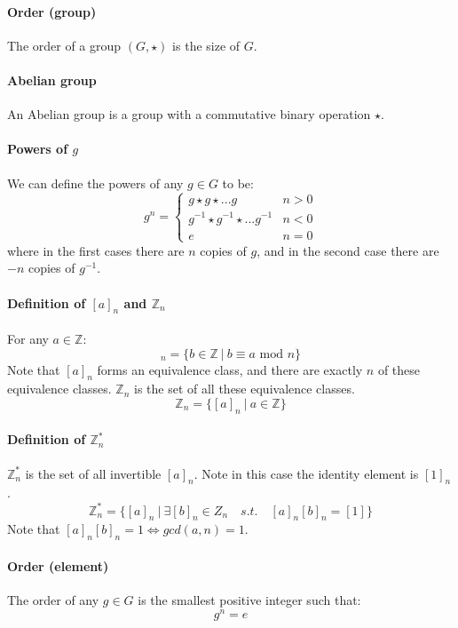\documentclass{article}
\newcommand{\Z}{\mathbb{Z}}
\begin{document}
\paragraph{Order (group)}
The order of a group $ (G, \star) $ is the size of $ G $.
\paragraph{Abelian group}
An Abelian group is a group with a commutative binary operation $ \star $.
\paragraph{Powers of $ g $}
We can define the powers of any $ g \in G $ to be:
\begin{equation}
g^{n} = 
\begin{cases}
g \star g \star ... g & n > 0 \\
g^{-1} \star g^{-1} \star ... g^{-1} & n < 0 \\
e & n = 0
\end{cases}
\end{equation}
where in the first cases there are $ n $ copies of $ g $, and in the second case there are $ -n $ copies of $ g^{-1} $.
\paragraph{Definition of $ [a]_{n} $ and $ \Z_{n} $}
For any $ a \in \Z $:
\begin{equation}
[a]_{n} = \{b \in \Z \ | \ b \equiv a \textrm{ mod } n \}
\end{equation}
Note that $ [a]_{n} $ forms an equivalence class, and there are exactly $ n $ of these equivalence classes. $ \Z_{n} $ is the set of all these equivalence classes.
\begin{equation}
\Z_{n} = \{[a]_{n} \ | \ a \in \Z \}
\end{equation}
\paragraph{Definition of $ \Z_{n}^{*} $}
$ \Z_{n}^{*} $ is the set of all invertible $ [a]_{n} $. Note in this case the identity element is $ [1]_{n} $.
\begin{equation}
\Z_{n}^{*} = \{[a]_{n} \ | \ \exists [b]_{n} \in Z_{n} \quad s.t. \quad [a]_{n}[b]_{n} = [1]\}
\end{equation}
Note that $ [a]_{n}[b]_{n} = 1 \Leftrightarrow gcd(a, n) = 1 $.
\paragraph{Order (element)}
The order of any $ g \in G $ is the smallest positive integer such that:
\begin{equation}
g^{n} = e
\end{equation}
\end{document}

